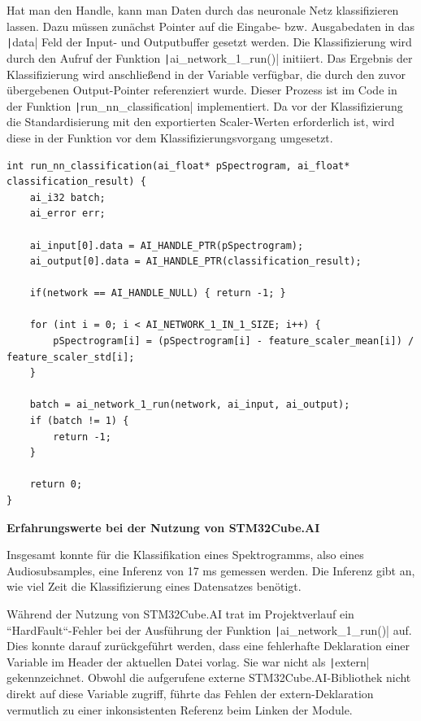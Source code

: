 Hat man den Handle, kann man Daten durch das neuronale Netz klassifizieren lassen. Dazu müssen zunächst Pointer auf die Eingabe- bzw. Ausgabedaten in das \texttt|data| Feld der Input- und Outputbuffer gesetzt werden. Die Klassifizierung wird durch den Aufruf der Funktion \texttt|ai_network_1_run()| initiiert. Das Ergebnis der Klassifizierung wird anschließend in der Variable verfügbar, die durch den zuvor übergebenen Output-Pointer referenziert wurde. Dieser Prozess ist im Code in der Funktion \texttt|run_nn_classification| implementiert. Da vor der Klassifizierung die Standardisierung mit den exportierten Scaler-Werten erforderlich ist, wird diese in der Funktion vor dem Klassifizierungsvorgang umgesetzt.

\begin{verbatim}
int run_nn_classification(ai_float* pSpectrogram, ai_float* classification_result) {
    ai_i32 batch;
    ai_error err;

    ai_input[0].data = AI_HANDLE_PTR(pSpectrogram);
    ai_output[0].data = AI_HANDLE_PTR(classification_result);

    if(network == AI_HANDLE_NULL) { return -1; }

    for (int i = 0; i < AI_NETWORK_1_IN_1_SIZE; i++) {
    	pSpectrogram[i] = (pSpectrogram[i] - feature_scaler_mean[i]) / feature_scaler_std[i];
    }

    batch = ai_network_1_run(network, ai_input, ai_output);
    if (batch != 1) {
        return -1;
    }

    return 0;
}

\end{verbatim}

\textbf{Erfahrungswerte bei der Nutzung von STM32Cube.AI}

Insgesamt konnte für die Klassifikation eines Spektrogramms, also eines Audiosubsamples, eine Inferenz von 17 ms gemessen werden. Die Inferenz gibt an, wie viel Zeit die Klassifizierung eines Datensatzes benötigt.

Während der Nutzung von STM32Cube.AI trat im Projektverlauf ein ``HardFault``-Fehler bei der Ausführung der Funktion \texttt|ai_network_1_run()| auf. Dies konnte darauf zurückgeführt werden, dass eine fehlerhafte Deklaration einer Variable im Header der aktuellen Datei vorlag. Sie war nicht als \texttt|extern| gekennzeichnet. Obwohl die aufgerufene externe STM32Cube.AI-Bibliothek nicht direkt auf diese Variable zugriff, führte das Fehlen der extern-Deklaration vermutlich zu einer inkonsistenten Referenz beim Linken der Module.

